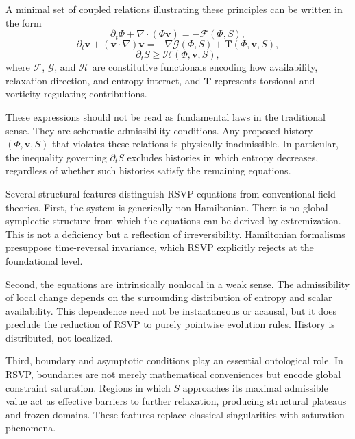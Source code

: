 \documentclass[11pt,oneside]{book}
\begin{document}
A minimal set of coupled relations illustrating these principles can be written in the form
\begin{equation}
\partial_t \Phi + \nabla \cdot (\Phi \mathbf{v}) = -\mathcal{F}(\Phi,S),
\end{equation}
\begin{equation}
\partial_t \mathbf{v} + (\mathbf{v}\cdot\nabla)\mathbf{v} = -\nabla \mathcal{G}(\Phi,S) + \mathbf{T}(\Phi,\mathbf{v},S),
\end{equation}
\begin{equation}
\partial_t S \ge \mathcal{H}(\Phi,\mathbf{v},S),
\end{equation}
where $\mathcal{F}$, $\mathcal{G}$, and $\mathcal{H}$ are constitutive functionals encoding how availability, relaxation direction, and entropy interact, and $\mathbf{T}$ represents torsional and vorticity-regulating contributions.

These expressions should not be read as fundamental laws in the traditional sense. They are schematic admissibility conditions. Any proposed history $(\Phi,\mathbf{v},S)$ that violates these relations is physically inadmissible. In particular, the inequality governing $\partial_t S$ excludes histories in which entropy decreases, regardless of whether such histories satisfy the remaining equations.

Several structural features distinguish RSVP equations from conventional field theories. First, the system is generically non-Hamiltonian. There is no global symplectic structure from which the equations can be derived by extremization. This is not a deficiency but a reflection of irreversibility. Hamiltonian formalisms presuppose time-reversal invariance, which RSVP explicitly rejects at the foundational level.

Second, the equations are intrinsically nonlocal in a weak sense. The admissibility of local change depends on the surrounding distribution of entropy and scalar availability. This dependence need not be instantaneous or acausal, but it does preclude the reduction of RSVP to purely pointwise evolution rules. History is distributed, not localized.

Third, boundary and asymptotic conditions play an essential ontological role. In RSVP, boundaries are not merely mathematical conveniences but encode global constraint saturation. Regions in which $S$ approaches its maximal admissible value act as effective barriers to further relaxation, producing structural plateaus and frozen domains. These features replace classical singularities with saturation phenomena.
\end{document}
